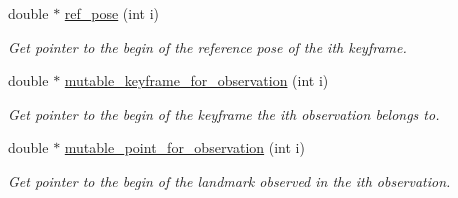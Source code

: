 \begin{DoxyCompactItemize}
double $\ast$ \hyperlink{classBALProblem_ab9462d8a6cab6fe6ecc20e299048e611}{ref\+\_\+pose} (int i)
\begin{DoxyCompactList}\small\item\em Get pointer to the begin of the reference pose of the ith keyframe. \end{DoxyCompactList}\item 
\mbox{\label{classBALProblem_ac2584b6fcb2111ec0af43332fbf3cb12}} 
double $\ast$ \hyperlink{classBALProblem_ac2584b6fcb2111ec0af43332fbf3cb12}{mutable\+\_\+keyframe\+\_\+for\+\_\+observation} (int i)
\begin{DoxyCompactList}\small\item\em Get pointer to the begin of the keyframe the ith observation belongs to. \end{DoxyCompactList}\item 
\mbox{\label{classBALProblem_a52472f4c0418e0a4ccb981c60f2e3af2}} 
double $\ast$ \hyperlink{classBALProblem_a52472f4c0418e0a4ccb981c60f2e3af2}{mutable\+\_\+point\+\_\+for\+\_\+observation} (int i)
\begin{DoxyCompactList}\small\item\em Get pointer to the begin of the landmark observed in the ith observation. \end{DoxyCompactList}\end{DoxyCompactItemize}
